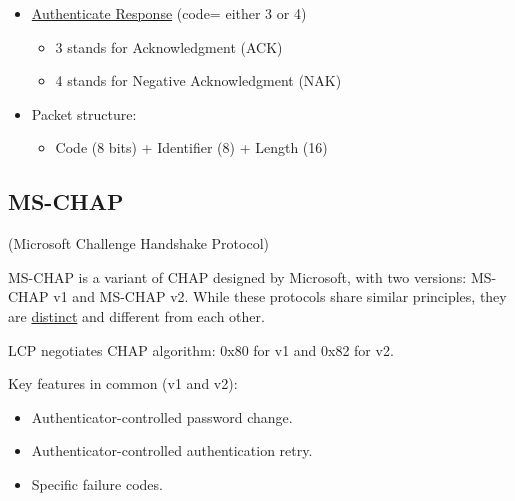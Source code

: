 \begin{tcolorbox}[colback=yellow!10!white, colframe=yellow!70!black, title=Authenticator \textrightarrow Peer] 
    
    \begin{itemize}
        \item \underline{Authenticate Response} (code= either 3 or 4)
        \begin{itemize}
            \item 3 stands for Acknowledgment (ACK)
            \item 4 stands for Negative Acknowledgment (NAK)
        \end{itemize}
        \item Packet structure:
        \begin{itemize}
            \item Code (8 bits) + Identifier (8) + Length (16)
        \end{itemize}
    \end{itemize}
\end{tcolorbox}

\subsection{MS-CHAP}
\begin{center}
    (Microsoft Challenge Handshake Protocol)
\end{center}

MS-CHAP is a variant of CHAP designed by Microsoft, with two versions: MS-CHAP v1 and MS-CHAP v2. While these protocols share similar principles, they are \underline{distinct} and different from each other.

LCP negotiates CHAP algorithm: 0x80 for v1 and 0x82 for v2.

Key features in common (v1 and v2):
\begin{itemize}
    \item Authenticator-controlled password change.
    \item Authenticator-controlled authentication retry.
    \item Specific failure codes.
\end{itemize}

